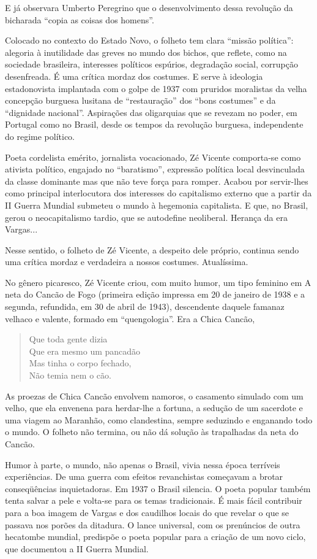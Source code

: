 E já observara Umberto Peregrino que o desenvolvimento dessa revolução
da bicharada “copia as coisas dos homens”. 

Colocado no contexto do Estado Novo, o folheto tem clara “missão
política”: alegoria à inutilidade das greves no mundo dos bichos, que
reflete, como na sociedade brasileira, interesses políticos espúrios,
degradação social, corrupção desenfreada. É uma crítica mordaz dos
costumes. E serve à ideologia estadonovista implantada com o golpe de
1937 com pruridos moralistas da velha concepção burguesa lusitana de
“restauração” dos “bons costumes” e da “dignidade nacional”.
Aspirações das oligarquias que se revezam no poder, em Portugal como
no Brasil, desde os tempos da revolução burguesa, independente do
regime político.

Poeta cordelista emérito, jornalista vocacionado, Zé Vicente
comporta-se como ativista político, engajado no “baratismo”,
expressão política local desvinculada da classe dominante mas que não
teve força para romper. Acabou por servir-lhes como principal
interlocutora dos interesses do capitalismo externo que a partir da
II Guerra Mundial submeteu o mundo à hegemonia capitalista. E que, no
Brasil, gerou o neocapitalismo tardio, que se autodefine neoliberal.
Herança da era Vargas...

Nesse sentido, o folheto de Zé Vicente, a despeito dele próprio,
continua sendo uma crítica mordaz e verdadeira a nossos costumes.
Atualíssima.

No gênero picaresco, Zé Vicente criou, com muito humor, um tipo
feminino em A neta do Cancão de Fogo (primeira edição impressa em 20
de janeiro de 1938 e a segunda, refundida, em 30 de abril de 1943),
descendente daquele famanaz velhaco e valente, formado em
“quengologia”. Era a Chica Cancão,

\begin{verse}
Que toda gente dizia\\
Que era mesmo um pancadão\\
Mas tinha o corpo fechado, \\
Não temia nem o cão.
\end{verse}

As proezas de Chica Cancão envolvem namoros, o casamento simulado com
um velho, que ela envenena para herdar-lhe a fortuna, a sedução de um
sacerdote e uma viagem ao Maranhão, como clandestina, sempre
seduzindo e enganando todo o mundo. O folheto não termina, ou não dá
solução às trapalhadas da neta do Cancão.

Humor à parte, o mundo, não apenas o Brasil, vivia nessa época
terríveis experiências. De uma guerra com efeitos revanchistas
começavam a brotar conseqüências inquietadoras. Em 1937 o Brasil
silencia. O poeta popular também tenta salvar a pele e volta-se para
os temas tradicionais. É mais fácil contribuir para a boa imagem de
Vargas e dos caudilhos locais do que revelar o que se passava nos
porões da ditadura. O lance universal, com os prenúncios de outra
hecatombe mundial, predispõe o poeta popular para a criação de um
novo ciclo, que documentou a II Guerra Mundial.

